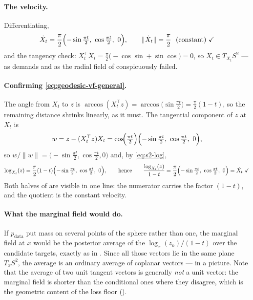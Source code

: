\documentclass[11pt,a4paper]{report}
\theoremstyle{definition}
\theoremstyle{remark}
\begin{document}
\paragraph{The velocity.} Differentiating,
\[
\dot X_t = \frac\pi2\Bigl(-\sin\tfrac{\pi t}2,\ \cos\tfrac{\pi t}2,\ 0\Bigr) ,
\qquad
\|\dot X_t\| = \frac\pi2 \ \ \text{(constant)} \ \checkmark
\]
and the tangency check:
$X_t^\top\dot X_t = \tfrac\pi2\bigl(-\cos\sin+\sin\cos\bigr)=0$, so
$\dot X_t\in T_{X_t}S^2$ \checkmark --- as  demands and
as the radial field of  conspicuously failed.

\paragraph{Confirming \eqref{eq:geodesic-vf-general}.} The angle from $X_t$
to $z$ is
$\arccos(X_t^\top z)=\arccos\bigl(\sin\tfrac{\pi t}2\bigr)=\tfrac\pi2(1-t)$,
so the remaining distance shrinks linearly, as it must. The tangential
component of $z$ at $X_t$ is
\[
w = z - (X_t^\top z)X_t
= \cos\!\Bigl(\tfrac{\pi t}2\Bigr)\Bigl(-\sin\tfrac{\pi t}2,\ \cos\tfrac{\pi t}2,\ 0\Bigr) ,
\]
so $w/\|w\|=\bigl(-\sin\tfrac{\pi t}2,\cos\tfrac{\pi t}2,0\bigr)$ and, by
\eqref{eq:s2-log},
\[
\log_{X_t}(z) = \frac\pi2(1-t)\Bigl(-\sin\tfrac{\pi t}2,\ \cos\tfrac{\pi t}2,\ 0\Bigr) ,
\qquad\text{hence}\qquad
\frac{\log_{X_t}(z)}{1-t} = \frac\pi2\Bigl(-\sin\tfrac{\pi t}2,\ \cos\tfrac{\pi t}2,\ 0\Bigr) = \dot X_t \ \checkmark
\]
Both halves of  are visible in one line: the
numerator carries the factor $(1-t)$, and the quotient is the constant
velocity.

\paragraph{What the marginal field would do.} If $p_{\mathrm{data}}$ put
mass on several points of the sphere rather than one, the marginal field at
$x$ would be the posterior average of the $\log_x(z_k)/(1-t)$ over the
candidate targets, exactly as in . Since all those
vectors lie in the same plane $T_xS^2$, the average is an ordinary average
of coplanar vectors ---  in a picture. Note that the
average of two unit tangent vectors is generally \emph{not} a unit vector:
the marginal field is shorter than the conditional ones where they disagree,
which is the geometric content of the loss floor
().

\end{document}
